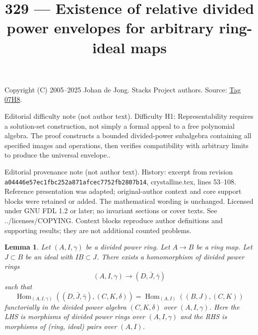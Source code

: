 \documentclass{amsart}
\theoremstyle{plain}
\newtheorem{lemma}[subsection]{Lemma}
\theoremstyle{definition}
\theoremstyle{remark}
\numberwithin{equation}{subsection}
\def\Hom{\mathop{\mathrm{Hom}}\nolimits}
\begin{document}
\title[Stacks Project, Tag 07H8]{329 --- Existence of relative divided power envelopes for arbitrary ring-ideal maps}
\maketitle
\noindent Copyright (C) 2005--2025 Johan de Jong. Stacks Project authors. Source: \href{https://stacks.math.columbia.edu/tag/07H8}{Tag 07H8}.

\noindent Editorial difficulty note (not author text). Difficulty H1: Representability requires a solution-set construction, not simply a formal appeal to a free polynomial algebra. The proof constructs a bounded divided-power subalgebra containing all specified images and operations, then verifies compatibility with arbitrary limits to produce the universal envelope..

\noindent Editorial provenance note (not author text). History: excerpt from revision \texttt{a0444\allowbreak 6e57e\allowbreak c1fbc\allowbreak 252a8\allowbreak 71afc\allowbreak ec775\allowbreak 2fb28\allowbreak 07b14}, crystalline.tex, lines 53--108. Reference presentation was adapted; original-author context and core support blocks were retained or added. The mathematical wording is unchanged. Licensed under GNU FDL 1.2 or later; no invariant sections or cover texts. See ../licenses/COPYING. Context blocks reproduce author definitions and supporting results; they are not additional counted problems.

\begin{lemma}
\label{lemma-divided-power-envelope}
Let $(A, I, \gamma)$ be a divided power ring.
Let $A \to B$ be a ring map. Let $J \subset B$ be an ideal
with $IB \subset J$. There exists a homomorphism of
divided power rings
$$
(A, I, \gamma) \longrightarrow (D, \bar J, \bar \gamma)
$$
such that
$$
\Hom_{(A, I, \gamma)}((D, \bar J, \bar \gamma), (C, K, \delta)) =
\Hom_{(A, I)}((B, J), (C, K))
$$
functorially in the divided power algebra $(C, K, \delta)$ over
$(A, I, \gamma)$. Here the LHS is morphisms of divided
power rings over $(A, I, \gamma)$ and the RHS is morphisms of
(ring, ideal) pairs over $(A, I)$.
\end{lemma}
\end{document}
